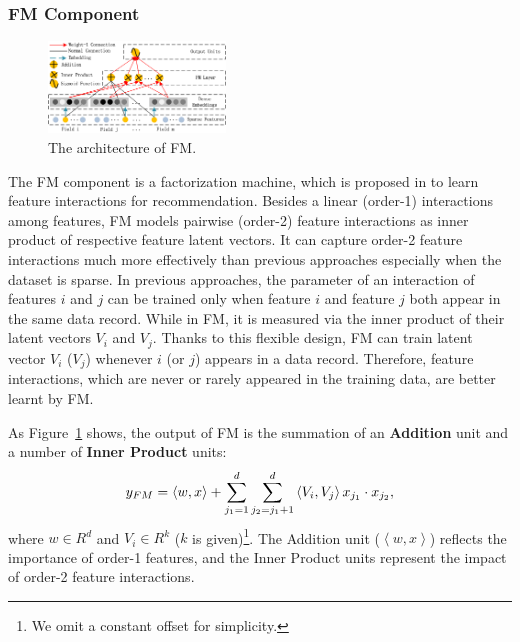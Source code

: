 \subsubsection{FM Component}\label{section:App:model:fm}
\begin{figure}[ht]
\setlength{\abovecaptionskip}{0pt}%
\setlength{\belowcaptionskip}{-10pt}
\centering
\includegraphics[width=0.42\textwidth]{img/architecture-fm.png}
\caption{\footnotesize{The architecture of FM. }}\label{fig:fm}
\end{figure}
The FM component is a factorization machine, which is proposed in \cite{fm} to learn feature interactions for recommendation. Besides a linear (order-1) interactions among features, FM models pairwise (order-2) feature interactions as inner product of respective feature latent vectors.
It can capture order-2 feature interactions much more effectively than previous approaches especially when the dataset is sparse. In previous approaches, the parameter of an interaction of features $i$ and $j$ can be trained only when feature $i$ and feature $j$ both appear in the same data record. While in FM, it is measured via the inner product of their latent vectors $V_{i}$ and $V_{j}$. Thanks to this flexible design, FM can train latent vector $V_{i}$ ($V_{j}$) whenever $i$ (or $j$) appears in a data record. Therefore, feature interactions, which are never or rarely appeared in the training data, are better learnt by FM.

As Figure~\ref{fig:fm} shows, the output of FM is the summation of an \textbf{Addition} unit and a number of \textbf{Inner Product} units:
\begin{equation}
\centering
y_{FM}=\left< w,x  \right> +\sum_{j_1=1}^{d}\sum_{j_2=j_1+1}^{d}\left< V_i,V_j  \right>  x_{j_1}\cdot x_{j_2},
\label{eq:FM-model}
\end{equation}
where $w \in R^d$ and $V_i\in R^k$ ($k$ is given)\footnote{We omit a constant offset for simplicity.}. The Addition unit ($\left< w,x  \right>$) reflects the importance of order-1 features, and the Inner Product units represent the impact of order-2 feature interactions.

